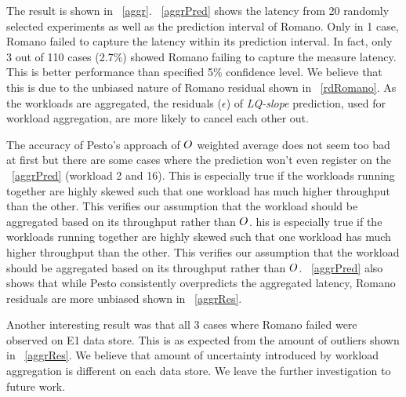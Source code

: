 The result is shown in \figurename~\ref{aggr}.
\figurename~\ref{aggrPred} shows the latency from 20 randomly selected experiments as well as the prediction interval of Romano.
Only in 1 case, Romano failed to capture the latency within its prediction interval.
In fact, only 3 out of 110 cases (2.7\%) showed Romano failing to capture the measure latency.
This is better performance than specified 5\% confidence level.
We believe that this is due to the unbiased nature of Romano residual shown in \figurename~\ref{rdRomano}.
As the workloads are aggregated, the residuals ($\epsilon$) of \emph{LQ-slope} prediction, used for workload aggregation, are more likely to cancel each other out.

The accuracy of Pesto's approach of $O$ weighted average does not seem too bad at first but there are some cases where the prediction won't even register on the \figurename~\ref{aggrPred} (workload 2 and 16).
This is especially true if the workloads running together are highly skewed such that one workload has much higher throughput than the other.
This verifies our assumption that the workload should be aggregated based on its throughput rather than $O$.
his is especially true if the workloads running together are highly skewed such that one workload has much higher throughput than the other.
This verifies our assumption that the workload should be aggregated based on its throughput rather than $O$.
\figurename~\ref{aggrPred} also shows that while Pesto consistently overpredicts the aggregated latency, Romano residuals are more unbiased shown in \figurename~\ref{aggrRes}.

Another interesting result was that all 3 cases where Romano failed were observed on E1 data store.
This is as expected from the amount of outliers shown in \figurename~\ref{aggrRes}.
We believe that amount of uncertainty introduced by workload aggregation is different on each data store.
We leave the further investigation to future work.

